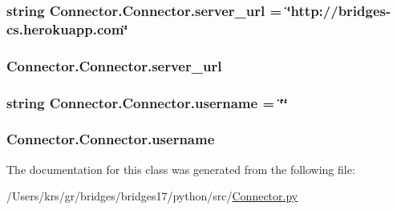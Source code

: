 \subsubsection[{server\+\_\+url}]{\setlength{\rightskip}{0pt plus 5cm}string Connector.\+Connector.\+server\+\_\+url = \char`\"{}http\+://bridges-\/cs.\+herokuapp.\+com\char`\"{}\hspace{0.3cm}{\ttfamily [static]}}\label{class_connector_1_1_connector_aee36fe395f89b6b4712cfc99f273bfa1}
\hypertarget{class_connector_1_1_connector_a0d600c0a34c2393eb6c5cbf80c5110d6}{}
\subsubsection[{server\+\_\+url}]{\setlength{\rightskip}{0pt plus 5cm}Connector.\+Connector.\+server\+\_\+url}\label{class_connector_1_1_connector_a0d600c0a34c2393eb6c5cbf80c5110d6}
\hypertarget{class_connector_1_1_connector_a9c6f760e8cf57a5392c54783046f156f}{}
\subsubsection[{username}]{\setlength{\rightskip}{0pt plus 5cm}string Connector.\+Connector.\+username = \char`\"{}\char`\"{}\hspace{0.3cm}{\ttfamily [static]}}\label{class_connector_1_1_connector_a9c6f760e8cf57a5392c54783046f156f}
\hypertarget{class_connector_1_1_connector_ace64a2a0c54ce06f70ee2b444d2e6f9d}{}
\subsubsection[{username}]{\setlength{\rightskip}{0pt plus 5cm}Connector.\+Connector.\+username}\label{class_connector_1_1_connector_ace64a2a0c54ce06f70ee2b444d2e6f9d}


The documentation for this class was generated from the following file\+:\begin{DoxyCompactItemize}
\item 
/\+Users/krs/gr/bridges/bridges17/python/src/\hyperlink{_connector_8py}{Connector.\+py}\end{DoxyCompactItemize}
